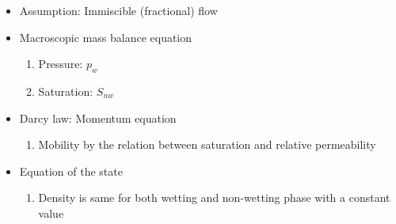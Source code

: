 \begin{itemize}
\item Assumption: Immiscible (fractional) flow


\item Macroscopic mass balance equation
  \begin{enumerate}
    \item Pressure: $p_w$
    \item Saturation: $S_{nw}$
  \end{enumerate}


\item Darcy law: Momentum equation
  \begin{enumerate}
    \item Mobility by the relation between saturation and relative permeability
  \end{enumerate}


\item Equation of the state
  \begin{enumerate}
    \item Density is same for both wetting and non-wetting phase with a constant value
  \end{enumerate}

\end{itemize}



\clearpage





